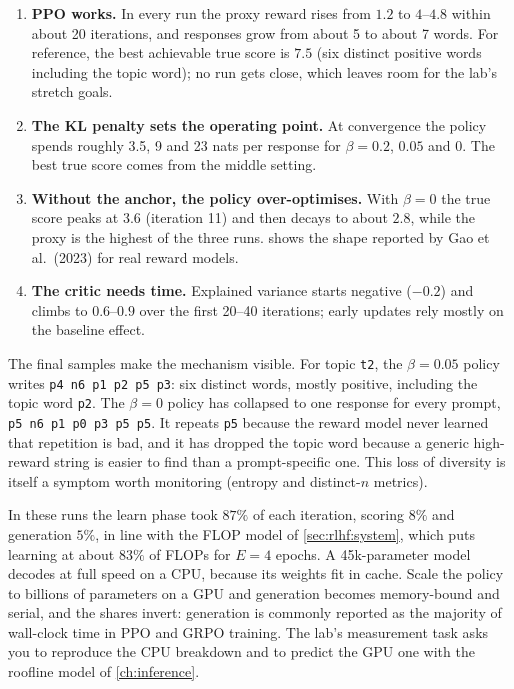 \begin{enumerate}
  \item \textbf{PPO works.} In every run the proxy reward rises from $1.2$ to $4$--$4.8$ within
        about 20 iterations, and responses grow from about 5 to about 7 words. For reference, the best
achievable true score is $7.5$ (six distinct positive words including the topic word); no run gets
close, which leaves room for the lab's stretch goals.
  \item \textbf{The KL penalty sets the operating point.} At convergence the policy spends roughly 3.5,
        9 and 23 nats per response for $\beta=0.2$, $0.05$ and $0$. The best true score comes from the
        middle setting.
  \item \textbf{Without the anchor, the policy over-optimises.} With $\beta=0$ the true score peaks at $3.6$
        (iteration 11) and then decays to about $2.8$, while the proxy is the highest of the three runs.
         shows the shape reported by Gao et al.\ (2023) for real reward models.
  \item \textbf{The critic needs time.} Explained variance starts negative ($-0.2$) and climbs to
        $0.6$--$0.9$ over the first 20--40 iterations; early updates rely mostly on the baseline effect.
\end{enumerate}

The final samples make the mechanism visible. For topic \texttt{t2}, the $\beta=0.05$ policy writes
\texttt{p4 n6 p1 p2 p5 p3}: six distinct words, mostly positive, including the topic word \texttt{p2}.
The $\beta=0$ policy has collapsed to one response for every prompt, \texttt{p5 n6 p1 p0 p3 p5 p5}.
It repeats \texttt{p5} because the reward model never learned that repetition is bad, and it has
dropped the topic word because a generic high-reward string is easier to find than a prompt-specific
one. This loss of diversity is itself a symptom worth monitoring (entropy and distinct-$n$ metrics).

\begin{systemslens}
In these runs the learn phase took $87\%$ of each iteration, scoring $8\%$ and generation $5\%$, in
line with the FLOP model of \cref{sec:rlhf:system}, which puts learning at about $83\%$ of FLOPs for
$E=4$ epochs. A 45k-parameter model decodes at full speed on a CPU, because its weights fit in cache. Scale the
policy to billions of parameters on a GPU and generation becomes memory-bound and serial, and the shares invert:
generation is commonly reported as the majority of wall-clock time in PPO and GRPO training. The lab's
measurement task asks you to reproduce the CPU breakdown and to predict the GPU one with the roofline
model of \cref{ch:inference}.
\end{systemslens}

